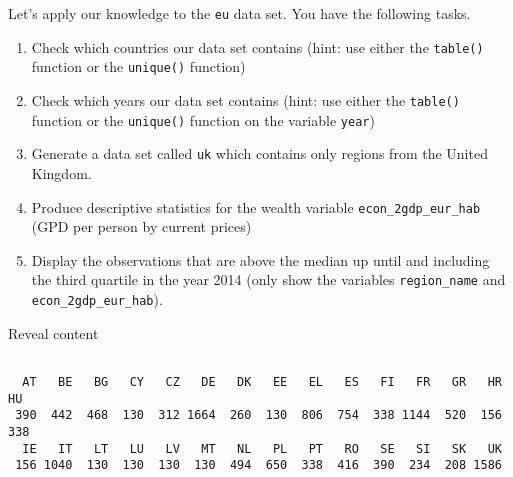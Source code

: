 \documentclass[]{article}
\newenvironment{Shaded}{\begin{snugshade}}{\end{snugshade}}
\newcommand{\KeywordTok}[1]{\textcolor[rgb]{0.13,0.29,0.53}{\textbf{#1}}}
\newcommand{\NormalTok}[1]{#1}
\newcommand{\OperatorTok}[1]{\textcolor[rgb]{0.81,0.36,0.00}{\textbf{#1}}}
\newcommand{\StringTok}[1]{\textcolor[rgb]{0.31,0.60,0.02}{#1}}
\providecommand{\tightlist}{%
  \setlength{\itemsep}{0pt}\setlength{\parskip}{0pt}}
\begin{document}
Let's apply our knowledge to the \texttt{eu} data set. You have the following tasks.

\begin{enumerate}
\def\labelenumi{\arabic{enumi}.}
\tightlist
\item
  Check which countries our data set contains (hint: use either the \texttt{table()} function or the \texttt{unique()} function)
\item
  Check which years our data set contains (hint: use either the \texttt{table()} function or the \texttt{unique()} function on the variable \texttt{year})
\item
  Generate a data set called \texttt{uk} which contains only regions from the United Kingdom.
\item
  Produce descriptive statistics for the wealth variable \texttt{econ\_2gdp\_eur\_hab} (GPD per person by current prices)
\item
  Display the observations that are above the median up until and including the third quartile in the year 2014 (only show the variables \texttt{region\_name} and \texttt{econ\_2gdp\_eur\_hab}).
\end{enumerate}

Reveal content

\begin{Shaded}
\end{Shaded}

\begin{verbatim}

  AT   BE   BG   CY   CZ   DE   DK   EE   EL   ES   FI   FR   GR   HR   HU 
 390  442  468  130  312 1664  260  130  806  754  338 1144  520  156  338 
  IE   IT   LT   LU   LV   MT   NL   PL   PT   RO   SE   SI   SK   UK 
 156 1040  130  130  130  130  494  650  338  416  390  234  208 1586 
\end{verbatim}

\begin{Shaded}
\end{Shaded}
\end{document}

